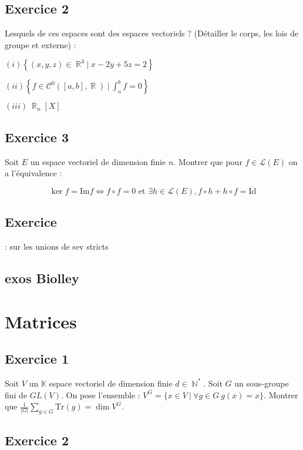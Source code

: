 \documentclass{article}
\DeclareMathOperator{\R}{\mathbb{R}}
\DeclareMathOperator{\N}{\mathbb{N}}
\begin{document}
\subsection*{Exercice 2} 

Lesquels de ces espaces sont des espaces vectoriels ? (Détailler le corps, les lois de groupe et externe) : 

$(i) \left\{ (x,y,z)\in \R^3  | \ x - 2y + 5z = 2 \right\}$ 

$(ii) \left\{ f \in \mathcal{C}^0([a, b], \R) \ | \ \displaystyle\int_a^b{f} = 0 \right\}  $  

$(iii) \  \R_n[X] $ 

\subsection*{Exercice 3} 

Soit $E$ un espace vectoriel de dimension finie $n$. Montrer que pour $f \in \mathcal{L}(E)$ on a l'équivalence : 

$$\ker{f} = \text{Im}{f} \Longleftrightarrow f\circ f = 0 \text{ et } \exists h \in \mathcal{L}(E), f\circ h + h\circ f = \text{Id} $$ 

\subsection*{Exercice} : sur les unions de sev stricts 



\subsection*{exos Biolley} 

\clearpage

\section{Matrices} 

\subsection*{Exercice 1} 

Soit $V$ un $\mathbb{K}$ espace vectoriel de dimension finie $d\in \N^*$. Soit $G$ un sous-groupe fini de $GL(V)$. On pose l'ensemble : $V^G = \{x\in V \ | \ \forall g \in G \ g(x) = x\}$. Montrer que $\displaystyle\frac{1}{|G|}\sum_{g\in G}{\text{Tr}(g)} = \dim{V^G}$. 

\subsection*{Exercice 2} 
\end{document}
